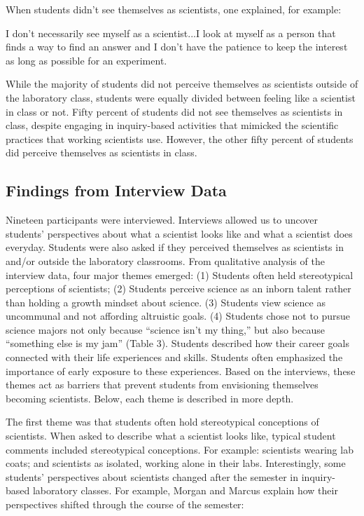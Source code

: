 \documentclass[11.5pt]{sig-alternate} %
\begin{document}
\begin{large}
When students didn’t see themselves as scientists, one explained, for example: 

I don’t necessarily see myself as a scientist...I look at myself as a person that finds a way to find an answer and I don’t have the patience to keep the interest as long as possible for an experiment.

While the majority of students did not perceive themselves as scientists outside of the laboratory class, students were equally divided between feeling like a scientist in class or not. Fifty percent of students did not see themselves as scientists in class, despite engaging in inquiry-based activities that mimicked the scientific practices that working scientists use. However, the other fifty percent of students did perceive themselves as scientists in class.

\subsection*{Findings from Interview Data}

Nineteen participants were interviewed. Interviews allowed us to uncover students’ perspectives about what a scientist looks like and what a scientist does everyday.  Students were also asked if they perceived themselves as scientists in and/or outside the laboratory classrooms. From qualitative analysis of the interview data, four major themes emerged: (1) Students often held stereotypical perceptions of scientists; (2) Students perceive science as an inborn talent rather than holding a growth mindset about science. (3) Students view science as uncommunal and not affording altruistic goals. (4) Students chose not to pursue science majors not only because “science isn’t my thing,” but also because “something else is my jam” (Table 3). Students described how their career goals connected with their life experiences and skills. Students often emphasized the importance of early exposure to these experiences. Based on the interviews, these themes act as barriers that prevent students from envisioning themselves becoming scientists. Below, each theme is described in more depth.

The first theme was that students often hold stereotypical conceptions of scientists. When asked to describe what a scientist looks like, typical student comments included stereotypical conceptions. For example: scientists wearing lab coats; and scientists as isolated, working alone in their labs. Interestingly, some students’ perspectives about scientists changed after the semester in inquiry-based laboratory classes. For example, Morgan and Marcus explain how their perspectives shifted through the course of the semester:


\end{large}
\end{document}
